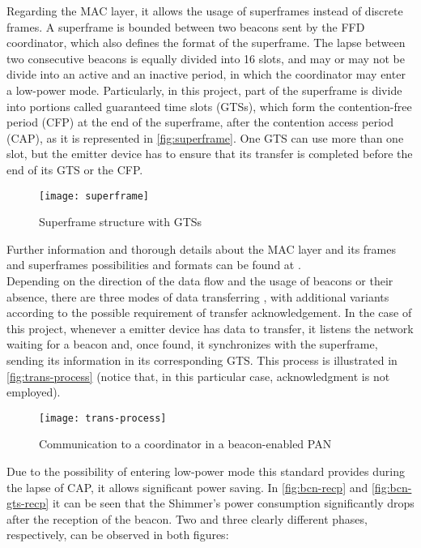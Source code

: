 			Regarding the MAC layer, it allows the usage of superframes instead of discrete frames. A superframe
			is bounded between two beacons sent by the FFD coordinator, which also defines the format of the
			superframe. The lapse between two consecutive beacons is equally divided into 16 slots, and may or may
			not be divide into an active and an inactive period, in which the coordinator may enter a low-power
			mode. Particularly, in this project, part of the superframe is divide into portions called guaranteed
			time slots (GTSs), which form the contention-free period (CFP) at the end of the superframe, after
			the contention access period (CAP), as it is represented in \autoref{fig:superframe}. One GTS can use
			more than one slot, but the emitter device has to ensure that its transfer is completed before the
			end of its GTS or the CFP.

			\begin{figure}[h]
				\texttt{[image: superframe]}
				\centering
				\caption{Superframe structure with GTSs}
				\label{fig:superframe}
			\end{figure}

			Further information and thorough details about the MAC layer and its frames and superframes
			possibilities and formats can be found at \cite[p. 67]{802.15.4}.\\

			Depending on the direction of the data flow and the usage of beacons or their absence, there
			are three modes of data transferring \cite[p. 18]{802.15.4}, with additional variants according to
			the possible requirement of transfer acknowledgement. In the case of this project, whenever a emitter
			device has data to transfer, it listens the network waiting for a beacon and, once found, it
			synchronizes with the superframe, sending its information in its corresponding GTS. This process is
			illustrated in \autoref{fig:trans-process} (notice that, in this particular case, acknowledgment is
			not employed).

			\begin{figure}[h]
				\texttt{[image: trans-process]}
				\centering
				\caption{Communication to a coordinator in a beacon-enabled PAN}
				\label{fig:trans-process}
			\end{figure}

			Due to the possibility of entering low-power mode this standard provides during the
			lapse of CAP, it allows significant power saving. In \autoref{fig:bcn-recp} and 
			\autoref{fig:bcn-gts-recp} it can be seen that the Shimmer's power consumption significantly drops
			after the reception of the beacon. Two and three clearly different phases, respectively, can be
			observed in both figures:

